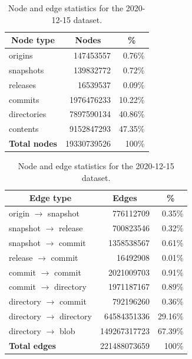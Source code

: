 \begin{table}
  \centering
  \caption{Node and edge statistics for the 2020-12-15 dataset.}
  \label{tab:corpus-stats}
  \begin{tabular}[t]{l|rr}
     \multicolumn{1}{c|}{\textbf{Node type}}
    & \multicolumn{1}{c}{\textbf{Nodes}}
    & \multicolumn{1}{c}{\textbf{\%}}
    \\\hline\hline
     origins      &  \num{147453557} & 0.76\% \\
     snapshots    &  \num{139832772} & 0.72\% \\
     releases     & \num{16539537} & 0.09\% \\
     commits      & \num{1976476233} & 10.22\% \\
     directories  & \num{7897590134}  & 40.86\% \\
     contents     & \num{9152847293}  & 47.35\% \\
    \hline\hline
    \multicolumn{1}{l|}{\textbf{Total nodes}} & \num{19330739526} & 100\% \\
  \end{tabular}

  \vspace{3ex}

  \begin{tabular}[t]{l|rr}
    \multicolumn{1}{c|}{\textbf{Edge type}}
    & \multicolumn{1}{c}{\textbf{Edges}}
    & \multicolumn{1}{c}{\textbf{\%}}
    \\\hline\hline
     origin     $\to$ snapshot  & \num{776112709} & 0.35\% \\
     snapshot   $\to$ release   & \num{700823546} & 0.32\% \\
     snapshot   $\to$ commit    & \num{1358538567} & 0.61\% \\
     release    $\to$ commit    & \num{16492908} & 0.01\% \\
     commit     $\to$ commit    & \num{2021009703} & 0.91\% \\
     commit     $\to$ directory & \num{1971187167} & 0.89\%\\
     directory  $\to$ commit    & \num{792196260} & 0.36\% \\
     directory  $\to$ directory & \num{64584351336} & 29.16\% \\
     directory  $\to$ blob      & \num{149267317723} & 67.39\% \\
    \hline\hline
    \multicolumn{1}{l|}{\textbf{Total edges}} & \num{221488073659} & 100\% \\
  \end{tabular}
\end{table}

